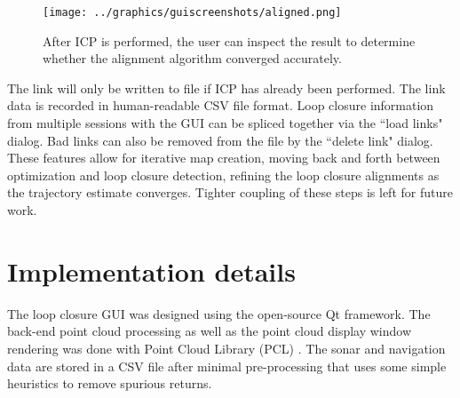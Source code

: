  \begin{figure}[htbp]
   \centering
   \texttt{[image: ../graphics/guiscreenshots/aligned.png]} %
   \caption{After ICP is performed, the user can inspect the result to determine whether the alignment algorithm converged accurately.}
   \label{fig:GUI_poseicp}
\end{figure}

The link will only be written to file if ICP has already been performed. The link data is recorded in human-readable CSV file format. Loop closure information from multiple sessions with the GUI can be spliced together via the ``load links" dialog. Bad links can also be removed from the file by the ``delete link" dialog. These features allow for iterative map creation, moving back and forth between optimization and loop closure detection, refining the loop closure alignments as the trajectory estimate converges. Tighter coupling of these steps is left for future work.

\section{Implementation details}

The loop closure GUI was designed using the open-source Qt framework. The back-end point cloud processing as well as the point cloud display window rendering was done with Point Cloud Library (PCL) \cite{PCL}.  The sonar and navigation data are stored in a CSV file after minimal pre-processing that uses some simple heuristics to remove spurious returns.

